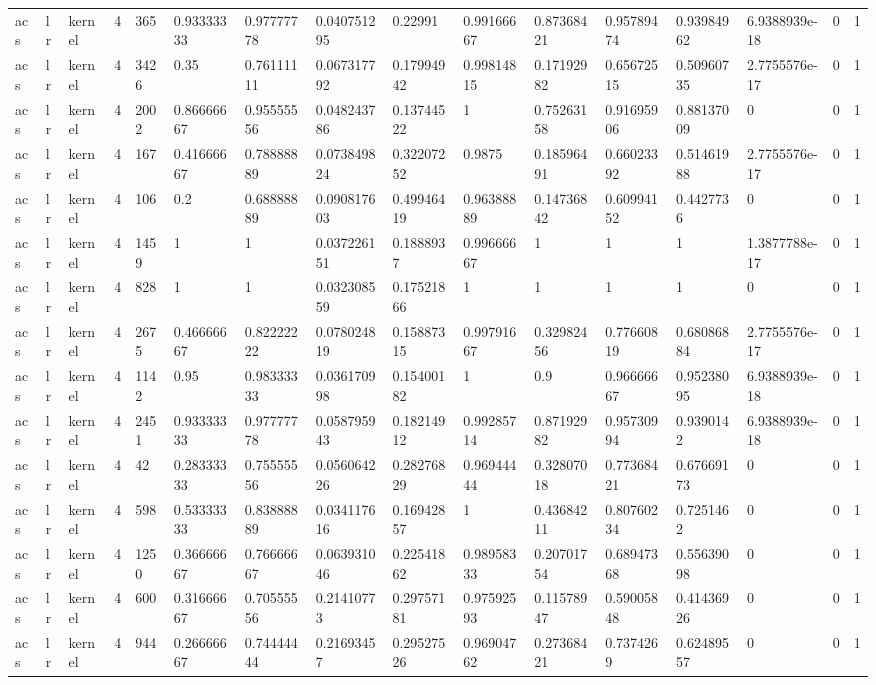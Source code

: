 \begin{tabular}{llllllllllllllll}
acs & lr & kernel & 4 & 365 & 0.93333333 & 0.97777778 & 0.040751295 & 0.22991 & 0.99166667 & 0.87368421 & 0.95789474 & 0.93984962 & 6.9388939e-18 & 0 & 1 \\
acs & lr & kernel & 4 & 3426 & 0.35 & 0.76111111 & 0.067317792 & 0.17994942 & 0.99814815 & 0.17192982 & 0.65672515 & 0.50960735 & 2.7755576e-17 & 0 & 1 \\
acs & lr & kernel & 4 & 2002 & 0.86666667 & 0.95555556 & 0.048243786 & 0.13744522 & 1 & 0.75263158 & 0.91695906 & 0.88137009 & 0 & 0 & 1 \\
acs & lr & kernel & 4 & 167 & 0.41666667 & 0.78888889 & 0.073849824 & 0.32207252 & 0.9875 & 0.18596491 & 0.66023392 & 0.51461988 & 2.7755576e-17 & 0 & 1 \\
acs & lr & kernel & 4 & 106 & 0.2 & 0.68888889 & 0.090817603 & 0.49946419 & 0.96388889 & 0.14736842 & 0.60994152 & 0.4427736 & 0 & 0 & 1 \\
acs & lr & kernel & 4 & 1459 & 1 & 1 & 0.037226151 & 0.1888937 & 0.99666667 & 1 & 1 & 1 & 1.3877788e-17 & 0 & 1 \\
acs & lr & kernel & 4 & 828 & 1 & 1 & 0.032308559 & 0.17521866 & 1 & 1 & 1 & 1 & 0 & 0 & 1 \\
acs & lr & kernel & 4 & 2675 & 0.46666667 & 0.82222222 & 0.078024819 & 0.15887315 & 0.99791667 & 0.32982456 & 0.77660819 & 0.68086884 & 2.7755576e-17 & 0 & 1 \\
acs & lr & kernel & 4 & 1142 & 0.95 & 0.98333333 & 0.036170998 & 0.15400182 & 1 & 0.9 & 0.96666667 & 0.95238095 & 6.9388939e-18 & 0 & 1 \\
acs & lr & kernel & 4 & 2451 & 0.93333333 & 0.97777778 & 0.058795943 & 0.18214912 & 0.99285714 & 0.87192982 & 0.95730994 & 0.9390142 & 6.9388939e-18 & 0 & 1 \\
acs & lr & kernel & 4 & 42 & 0.28333333 & 0.75555556 & 0.056064226 & 0.28276829 & 0.96944444 & 0.32807018 & 0.77368421 & 0.67669173 & 0 & 0 & 1 \\
acs & lr & kernel & 4 & 598 & 0.53333333 & 0.83888889 & 0.034117616 & 0.16942857 & 1 & 0.43684211 & 0.80760234 & 0.7251462 & 0 & 0 & 1 \\
acs & lr & kernel & 4 & 1250 & 0.36666667 & 0.76666667 & 0.063931046 & 0.22541862 & 0.98958333 & 0.20701754 & 0.68947368 & 0.55639098 & 0 & 0 & 1 \\
acs & lr & kernel & 4 & 600 & 0.31666667 & 0.70555556 & 0.21410773 & 0.29757181 & 0.97592593 & 0.11578947 & 0.59005848 & 0.41436926 & 0 & 0 & 1 \\
acs & lr & kernel & 4 & 944 & 0.26666667 & 0.74444444 & 0.21693457 & 0.29527526 & 0.96904762 & 0.27368421 & 0.7374269 & 0.62489557 & 0 & 0 & 1 \\

\end{tabular}
